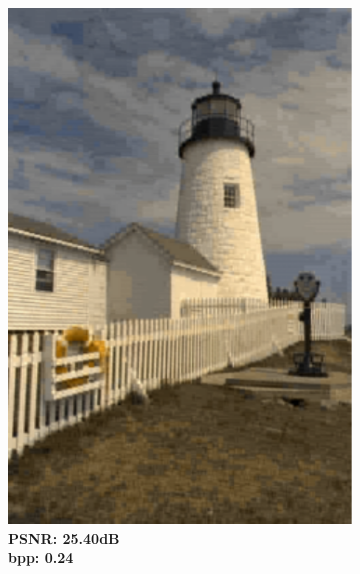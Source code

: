 \begin{figure}[t]
\begin{subfigure}{.2\textwidth}
		\includegraphics[width=.95\textwidth]{figures/kodim19_IMF - RGB_bpp_0.263_psnr_25.402.pdf}
		\caption*{\tiny \textbf{PSNR: 25.40dB \\ bpp: 0.24}}
	\end{subfigure}%
    \begin{subfigure}{.2\textwidth}
		\centering

\end{subfigure}
\end{figure}
